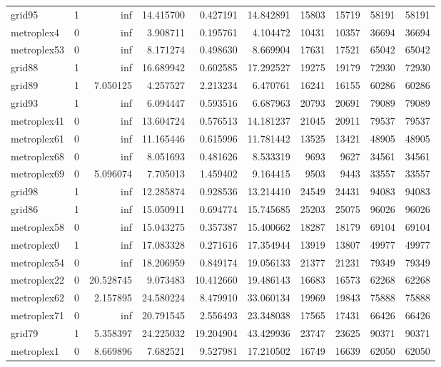 \begin{longtable}{|l|r|r|r|r|r|r|r|r|r|}
grid95 & 1 & inf & 14.415700 & 0.427191 & 14.842891 & 15803 & 15719 & 58191 & 58191 \\
metroplex4 & 0 & inf & 3.908711 & 0.195761 & 4.104472 & 10431 & 10357 & 36694 & 36694 \\
metroplex53 & 0 & inf & 8.171274 & 0.498630 & 8.669904 & 17631 & 17521 & 65042 & 65042 \\
grid88 & 1 & inf & 16.689942 & 0.602585 & 17.292527 & 19275 & 19179 & 72930 & 72930 \\
grid89 & 1 & 7.050125 & 4.257527 & 2.213234 & 6.470761 & 16241 & 16155 & 60286 & 60286 \\
grid93 & 1 & inf & 6.094447 & 0.593516 & 6.687963 & 20793 & 20691 & 79089 & 79089 \\
metroplex41 & 0 & inf & 13.604724 & 0.576513 & 14.181237 & 21045 & 20911 & 79537 & 79537 \\
metroplex61 & 0 & inf & 11.165446 & 0.615996 & 11.781442 & 13525 & 13421 & 48905 & 48905 \\
metroplex68 & 0 & inf & 8.051693 & 0.481626 & 8.533319 & 9693 & 9627 & 34561 & 34561 \\
metroplex69 & 0 & 5.096074 & 7.705013 & 1.459402 & 9.164415 & 9503 & 9443 & 33557 & 33557 \\
grid98 & 1 & inf & 12.285874 & 0.928536 & 13.214410 & 24549 & 24431 & 94083 & 94083 \\
grid86 & 1 & inf & 15.050911 & 0.694774 & 15.745685 & 25203 & 25075 & 96026 & 96026 \\
metroplex58 & 0 & inf & 15.043275 & 0.357387 & 15.400662 & 18287 & 18179 & 69104 & 69104 \\
metroplex0 & 1 & inf & 17.083328 & 0.271616 & 17.354944 & 13919 & 13807 & 49977 & 49977 \\
metroplex54 & 0 & inf & 18.206959 & 0.849174 & 19.056133 & 21377 & 21231 & 79349 & 79349 \\
metroplex22 & 0 & 20.528745 & 9.073483 & 10.412660 & 19.486143 & 16683 & 16573 & 62268 & 62268 \\
metroplex62 & 0 & 2.157895 & 24.580224 & 8.479910 & 33.060134 & 19969 & 19843 & 75888 & 75888 \\
metroplex71 & 0 & inf & 20.791545 & 2.556493 & 23.348038 & 17565 & 17431 & 66426 & 66426 \\
grid79 & 1 & 5.358397 & 24.225032 & 19.204904 & 43.429936 & 23747 & 23625 & 90371 & 90371 \\
metroplex1 & 0 & 8.669896 & 7.682521 & 9.527981 & 17.210502 & 16749 & 16639 & 62050 & 62050 \\

\end{longtable}
